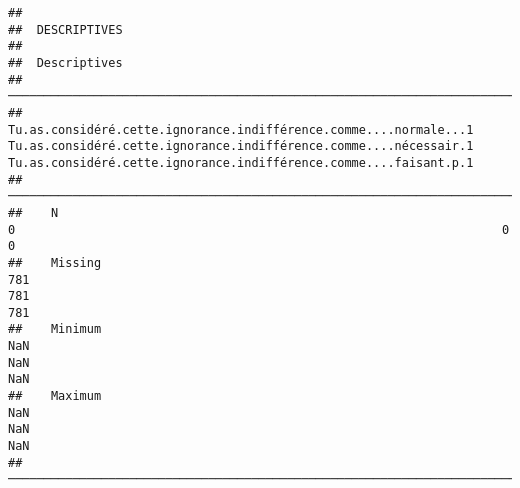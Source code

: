 \documentclass[
]{article}
\begin{document}
\begin{verbatim}
## 
##  DESCRIPTIVES
## 
##  Descriptives                                                                                                                                                                                                               
##  ────────────────────────────────────────────────────────────────────────────────────────────────────────────────────────────────────────────────────────────────────────────────────────────────────────────────────────── 
##               Tu.as.considéré.cette.ignorance.indifférence.comme....normale...1    Tu.as.considéré.cette.ignorance.indifférence.comme....nécessair.1    Tu.as.considéré.cette.ignorance.indifférence.comme....faisant.p.1   
##  ────────────────────────────────────────────────────────────────────────────────────────────────────────────────────────────────────────────────────────────────────────────────────────────────────────────────────────── 
##    N                                                                          0                                                                    0                                                                    0   
##    Missing                                                                  781                                                                  781                                                                  781   
##    Minimum                                                                  NaN                                                                  NaN                                                                  NaN   
##    Maximum                                                                  NaN                                                                  NaN                                                                  NaN   
##  ──────────────────────────────────────────────────────────────────────────────────────────────────────────────────────────────────────────────────────────────────────────────────────────────────────────────────────────
\end{verbatim}
\end{document}
